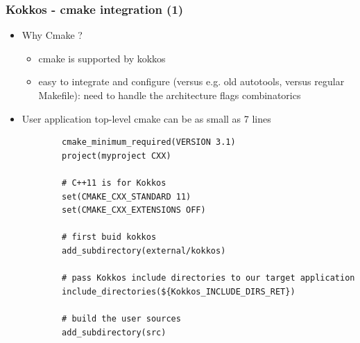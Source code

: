 \begin{frame}[fragile=singleslide]
  \frametitle{Kokkos - cmake integration (1)}

  \begin{itemize}
  \item Why Cmake ?
    \begin{itemize}
    \item cmake is supported by kokkos
    \item easy to integrate and configure (versus e.g. old autotools, versus regular Makefile): need to handle the architecture flags combinatorics
    \end{itemize}
  \item User application top-level cmake can be as small as 7 lines
    {\small
      \begin{verbatim}
        cmake_minimum_required(VERSION 3.1)
        project(myproject CXX)
        
        # C++11 is for Kokkos
        set(CMAKE_CXX_STANDARD 11)
        set(CMAKE_CXX_EXTENSIONS OFF)
        
        # first buid kokkos
        add_subdirectory(external/kokkos)
        
        # pass Kokkos include directories to our target application
        include_directories(${Kokkos_INCLUDE_DIRS_RET})
        
        # build the user sources
        add_subdirectory(src)
      \end{verbatim}
      }
  \end{itemize}
  
\end{frame}

